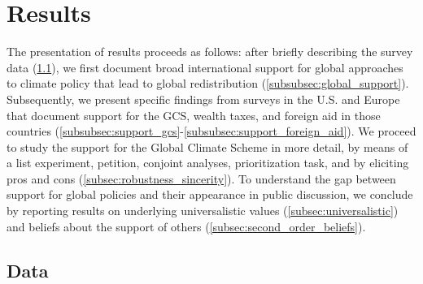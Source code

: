 

\section{Results}
The presentation of results proceeds as follows: after briefly describing the survey data (\ref{subsec:data}), we first document broad international support for global approaches to climate policy that lead to global redistribution (\ref{subsubsec:global_support}). Subsequently, we present specific findings from surveys in the U.S. and Europe that document support for the GCS, wealth taxes, and foreign aid in those countries (\ref{subsubsec:support_gcs}-\ref{subsubsec:support_foreign_aid}). We proceed to study the support for the Global Climate Scheme in more detail, by means of a list experiment, petition, conjoint analyses, prioritization task, and by eliciting pros and cons (\ref{subsec:robustness_sincerity}). To understand the gap between support for global policies and their appearance in public discussion, we conclude by reporting results on underlying universalistic values (\ref{subsec:universalistic}) and beliefs about the support of others (\ref{subsec:second_order_beliefs}). 



\subsection{Data}\label{subsec:data}



